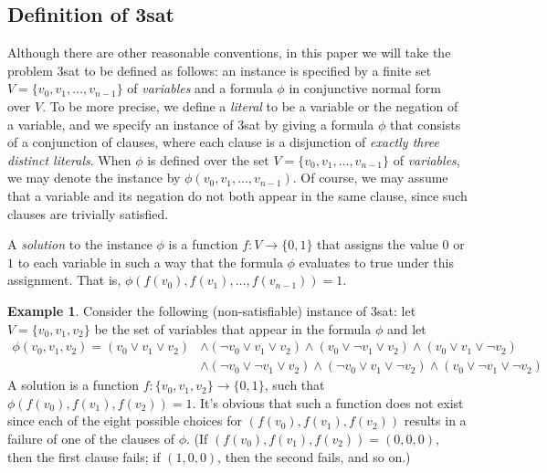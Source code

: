\documentclass[12pt]{amsart}
\numberwithin{equation}{section}
\theoremstyle{plain}
\theoremstyle{definition}
\newtheorem{example}[theorem]{Example}
\newcommand{\sat}{\acs{sat}\xspace}
\begin{document}
\subsection{Definition of 3\sat}
Although there are other reasonable conventions, in this paper we
will take the problem 3\sat to be defined as follows:
an instance is specified by a finite set
$V = \{v_0, v_1, \dots, v_{n-1}\}$ of \emph{variables} and
a formula $\phi$ in conjunctive normal form
over $V$. To be more precise, we define a \emph{literal} to be a variable or
the negation of a variable, and we specify an instance of 3\sat 
by giving a formula $\phi$ that consists of 
a conjunction of clauses, where each clause is a 
disjunction of \emph{exactly three distinct literals}.
When $\phi$ is defined over the set $V = \{v_0, v_1, \dots, v_{n-1}\}$
of \emph{variables}, we may denote the instance
by $\phi(v_0, v_1, \dots, v_{n-1})$.
Of course, we may assume that a variable and its negation do not both
appear in the same clause, since such clauses are trivially satisfied.

A \emph{solution} to the instance $\phi$ is a function 
$f: V \to \{0,1\}$ that assigns the value $0$ or 
$1$ to each variable in such a way that the formula $\phi$ evaluates to true under
this assignment. That is, $\phi(f(v_0), f(v_1), \dots, f(v_{n-1})) = 1$.


\begin{example}
Consider the following (non-satisfiable) instance of  3\sat:
let $V = \{v_0, v_1, v_2\}$ be the set of variables that appear in the
formula $\phi$ and let
\begin{align*}
\phi(v_0, v_1, v_2) = (v_0 \vee v_1 \vee v_2) &\wedge
(\neg v_0 \vee v_1 \vee v_2) \wedge
(v_0 \vee \neg v_1 \vee v_2) 
 \wedge (v_0 \vee v_1 \vee \neg v_2) \\
&\wedge
(\neg v_0 \vee \neg v_1 \vee v_2)
\wedge (\neg v_0 \vee v_1 \vee \neg v_2) \wedge
(v_0 \vee \neg v_1 \vee \neg v_2)
\end{align*}
A solution is a function
$f: \{v_0, v_1, v_2\} \to \{0, 1\}$, such that $\phi(f(v_0), f(v_1), f(v_2))= 1$.
It's obvious that such a function does not exist since
each of the eight possible choices for $(f(v_0), f(v_1), f(v_2))$
results in a failure of one of the clauses of $\phi$.
(If $(f(v_0), f(v_1), f(v_2)) = (0,0,0)$, then the first clause fails;
if $(1,0,0)$, then the second fails, and so on.)
\end{example}
\end{document}
